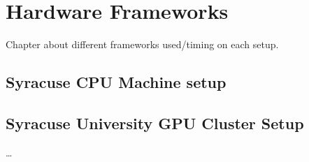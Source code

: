 \chapter{Hardware Frameworks}\label{ch:hardware}
Chapter about different frameworks used/timing on each setup.
\section{Syracuse CPU Machine setup}
\section{Syracuse University GPU Cluster Setup}
\dots
